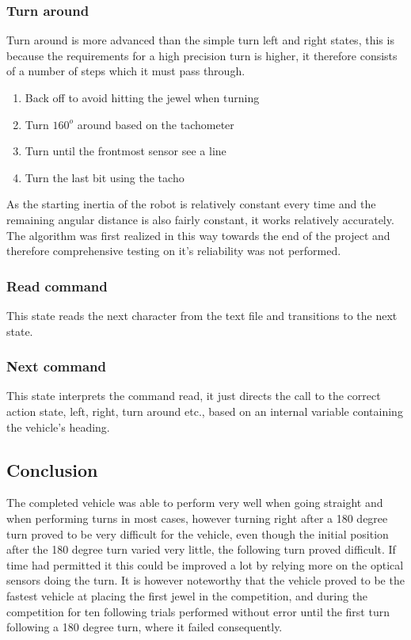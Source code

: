\documentclass[draft, english, a4paper]{article}
\begin{document}
	    \subsubsection{Turn around}
	        Turn around is more advanced than the simple turn left and right
	        states, this is because the requirements for a high precision turn is
	        higher, it therefore consists of a number of steps which it must pass
	        through.
	        \begin{enumerate}
	            \item Back off to avoid hitting the jewel when turning
	            \item Turn $160^o$ around based on the tachometer
	            \item Turn until the frontmost sensor see a line
	            \item Turn the last bit using the tacho
	        \end{enumerate}
	        As the starting inertia of the robot is relatively constant every time
	        and the remaining angular distance is also fairly constant, 
	        it works relatively accurately.
	        The algorithm was first realized in this way towards the end of the project
	        and therefore comprehensive testing on it's reliability was not performed.
	    \subsubsection{Read command}
	        This state reads the next character from the text file and 
	        transitions to the next state.
	    \subsubsection{Next command}
	        This state interprets the command read, it just directs the call
	        to the correct action state, left, right, turn around etc., based on 
	        an internal variable containing the vehicle's heading. 

	\subsection{Conclusion} %
	   The completed vehicle was able to perform very well when going straight
	   and when performing turns in most cases, however turning right after a
	   180 degree turn proved to be very difficult for the vehicle, even though
	   the initial position after the 180 degree turn varied very little, the 
	   following turn proved difficult. If time had permitted it this could be 
	   improved a lot by relying more on the optical sensors doing the turn.
	   It is however noteworthy that the vehicle proved to be the fastest vehicle
	   at placing the first jewel in the competition, and during the competition for ten following trials
	   performed without error until the first turn following a 180 degree turn, where it failed consequently.
\end{document}

